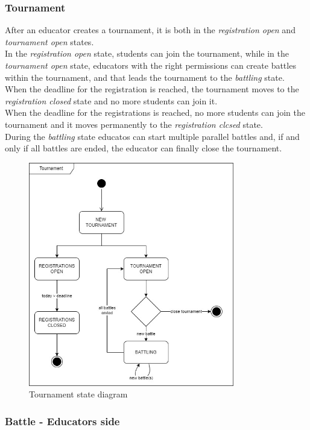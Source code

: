 \subsubsection*{Tournament}
After an educator creates a tournament, it is both in the \textit{registration open} and \textit{tournament open} states.\\
In the \textit{registration open} state, students can join the tournament, while in the \textit{tournament open} state, educators with the right permissions can create battles within the tournament, and that leads the tournament to the \textit{battling} state.\\
When the deadline for the registration is reached, the tournament moves to the \textit{registration closed} state and no more students can join it.\\
When the deadline for the registrations is reached, no more students can join the tournament and it moves permanently to the \textit{registration clcsed} state.\\
During the \textit{battling} state educatos can start multiple parallel battles and, if and only if all battles are ended, the educator can finally close the tournament.\\

\begin{figure}
    \centering
    \includegraphics[width=0.8\textwidth]{state_diagrams/tournament.jpg}
    \caption{Tournament state diagram}
\end{figure}

\subsubsection*{Battle - Educators side}

